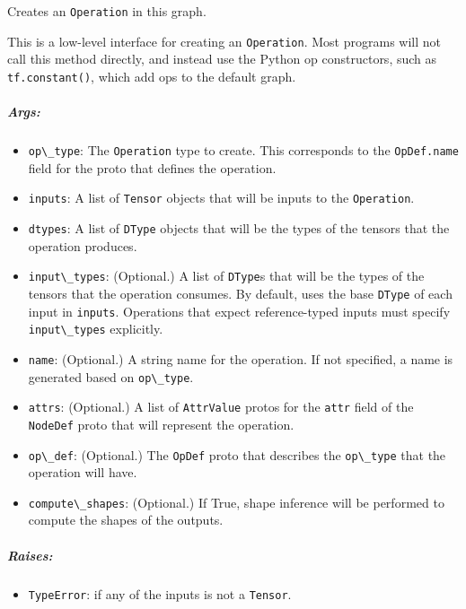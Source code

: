 Creates an \lstinline{Operation} in this graph.

This is a low-level interface for creating an \lstinline{Operation}. Most
programs will not call this method directly, and instead use the Python
op constructors, such as \lstinline{tf.constant()}, which add ops to the
default graph.

\subparagraph{Args: }\label{args-10}

\begin{itemize}
\tightlist
\item
  \lstinline{op\_type}: The \lstinline{Operation} type to create. This
  corresponds to the \lstinline{OpDef.name} field for the proto that
  defines the operation.
\item
  \lstinline{inputs}: A list of \lstinline{Tensor} objects that will be inputs
  to the \lstinline{Operation}.
\item
  \lstinline{dtypes}: A list of \lstinline{DType} objects that will be the
  types of the tensors that the operation produces.
\item
  \lstinline{input\_types}: (Optional.) A list of \lstinline{DType}s that will
  be the types of the tensors that the operation consumes. By default,
  uses the base \lstinline{DType} of each input in \lstinline{inputs}.
  Operations that expect reference-typed inputs must specify
  \lstinline{input\_types} explicitly.
\item
  \lstinline{name}: (Optional.) A string name for the operation. If not
  specified, a name is generated based on \lstinline{op\_type}.
\item
  \lstinline{attrs}: (Optional.) A list of \lstinline{AttrValue} protos for
  the \lstinline{attr} field of the \lstinline{NodeDef} proto that will
  represent the operation.
\item
  \lstinline{op\_def}: (Optional.) The \lstinline{OpDef} proto that describes
  the \lstinline{op\_type} that the operation will have.
\item
  \lstinline{compute\_shapes}: (Optional.) If True, shape inference will be
  performed to compute the shapes of the outputs.
\end{itemize}

\subparagraph{Raises: }\label{raises-4}

\begin{itemize}
\tightlist
\item
  \lstinline{TypeError}: if any of the inputs is not a \lstinline{Tensor}.
\end{itemize}

